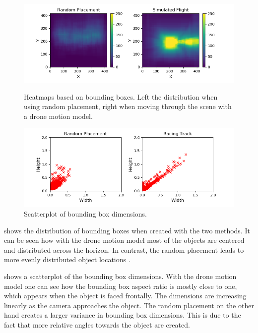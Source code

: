 \begin{figure}
	\begin{minipage}{\textwidth}
		\includegraphics[width=\textwidth]{fig/heatmap_camplace}
		\caption{Heatmaps based on bounding boxes. Left the distribution when using random placement, right when moving through the scene with a drone motion model.}
		\label{fig:heatmap_camplace}
	\end{minipage}
	\begin{minipage}{\textwidth}
		\includegraphics[width=\textwidth]{fig/aspect_ratios_camplace}
		\caption{Scatterplot of bounding box dimensions.}
		\label{fig:scatter_camplace}
	\end{minipage}
\end{figure}

 shows the distribution of bounding boxes when created with the two methods. It can be seen how with the drone motion model most of the objects are centered and distributed across the horizon. In contrast, the random placement leads to more evenly distributed object locations .

 shows a scatterplot of the bounding box dimensions. With the drone motion model one can see how the bounding box aspect ratio is mostly close to one, which appears when the object is faced frontally. The dimensions are increasing linearly as the camera approaches the object. The random placement on the other hand creates a larger variance in bounding box dimensions. This is due to the fact that more relative angles towards the object are created. 

